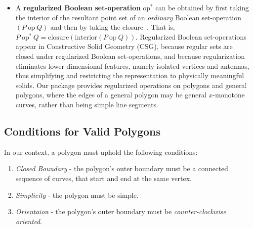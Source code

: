 \begin{itemize}
\item A \textbf{regularized Boolean set-operation} $\mbox{op}^*$ can be obtained by
first taking the interior of the resultant point set of an {\em ordinary}
Boolean set-operation $(P\ \mbox{op}\ Q)$ and then by taking the
closure~\cite{cgal:h-sm-04}. That is,
$P\ \mbox{op}^*\ Q = \mbox{closure}(\mbox{interior} (P\ \mbox{op}\ Q))$.
Regularized Boolean set-operations appear in Constructive Solid
Geometry (CSG), because regular sets are closed under regularized
Boolean set-operations, and because regularization eliminates lower
dimensional features, namely isolated vertices and antennas, thus
simplifying and restricting the representation to physically meaningful
solids. Our package provides regularized operations on polygons and
general polygons, where the edges of a general polygon may be
general $x$-monotone curves, rather than being simple line segments.
\end{itemize}
\subsection{Conditions for Valid Polygons\label{bso_ssec:polygon_validation}}

In our context, a polygon must uphold the following conditions:\\
\begin{enumerate}
 \item\textit{Closed Boundary} - the polygon's outer boundary must be a connected sequence of curves, that start and end at the same vertex.
\item \textit{Simplicity} - the polygon must be simple.
\item \textit{Orientaion} - the polygon's outer boundary must be \textit{counter-clockwise oriented}.
\end{enumerate}
 


